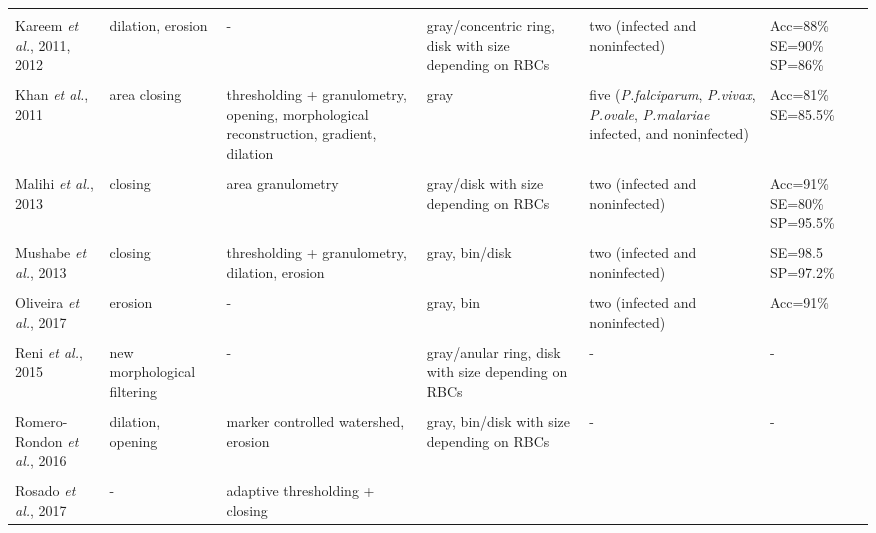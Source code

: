 \begin{longtable}{C{2.1cm} C{2.7cm} C{2.2cm} C{2.0cm} C{2.7cm} C{2.0cm} }
&   &  &  &  & \\
    Kareem \emph{et al.}, 2011, 2012  &
    	dilation, erosion &
    	-  &
    	gray/concentric ring, disk with size depending on RBCs  &
    	two (infected and noninfected) &
    	Acc=88\% SE=90\% SP=86\%
    \\	
&   &  &  &  & \\
    Khan \emph{et al.}, 2011  &
    	area closing &
    	thresholding + granulometry, opening, morphological reconstruction, gradient, dilation &
    	gray &
    	five (\emph{P.falciparum}, \emph{P.vivax}, \emph{P.ovale}, \emph{P.malariae} infected, and noninfected) &
    	Acc=81\% SE=85.5\%
    \\	
&   &  &  &  & \\
    Malihi \emph{et al.}, 2013  &
    	closing &
    	area granulometry  &
    	gray/disk with size depending on RBCs &
    	two (infected and noninfected) &
    	Acc=91\% SE=80\% SP=95.5\%
    \\	
&   &  &  &  & \\
    Mushabe \emph{et al.}, 2013  &
    	closing &
    	thresholding + granulometry, dilation, erosion  &
    	gray, bin/disk &
    	two (infected and noninfected) &
    	SE=98.5 SP=97.2\%
    \\	
&   &  &  &  & \\
    Oliveira \emph{et al.}, 2017  &
    	erosion &
    	-  &
    	gray, bin &
    	two (infected and noninfected) &
    	Acc=91\%
    \\
&   &  &  &  & \\
    Reni \emph{et al.}, 2015  &
    	new morphological filtering &
    	-  &
    	gray/anular ring, disk with size depending on RBCs &
    	- &
    	-
    \\
&   &  &  &  & \\
    Romero-Rondon \emph{et al.}, 2016  &
    	dilation, opening &
    	marker controlled watershed, erosion  &
    	gray, bin/disk with size depending on RBCs &
    	- &
    	-
    \\
&   &  &  &  & \\
    Rosado \emph{et al.}, 2017  &
    	- &
    	adaptive thresholding + closing  &

\end{longtable}
